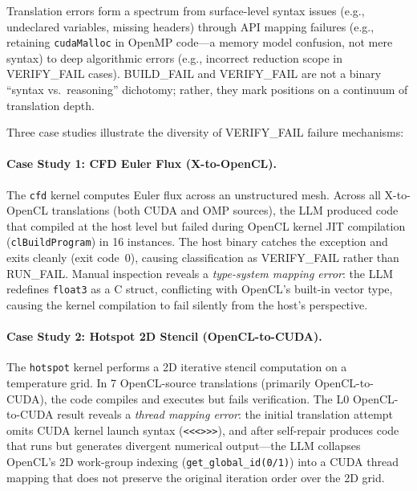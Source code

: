 \documentclass[conference]{IEEEtran}
\newcommand{\buildfail}{\textsc{BUILD\_FAIL}}
\newcommand{\runfail}{\textsc{RUN\_FAIL}}
\newcommand{\verifyfail}{\textsc{VERIFY\_FAIL}}
\begin{document}
Translation errors form a spectrum from surface-level syntax issues
(e.g., undeclared variables, missing headers) through API mapping
failures (e.g., retaining \texttt{cudaMalloc} in OpenMP code---a
memory model confusion, not mere syntax) to deep algorithmic
errors (e.g., incorrect reduction scope in \verifyfail{} cases).
\buildfail{} and \verifyfail{}{} are not a binary ``syntax vs.\ reasoning''
dichotomy; rather, they mark positions on a continuum of translation
depth.

Three case studies illustrate the diversity of \verifyfail{} failure mechanisms:

\paragraph{Case Study 1: CFD Euler Flux (X-to-OpenCL).}
The \texttt{cfd} kernel computes Euler flux across an unstructured mesh.
Across all X-to-OpenCL translations (both CUDA and OMP sources),
the LLM produced code that compiled at the host level but failed
during OpenCL kernel JIT compilation (\texttt{clBuildProgram}) in 16
instances. The host binary catches the exception and exits cleanly
(exit code~0), causing classification as \verifyfail{}{} rather than
\runfail{}. Manual inspection reveals a \emph{type-system mapping error}:
the LLM redefines \texttt{float3} as a C struct, conflicting with
OpenCL's built-in vector type, causing the kernel compilation to fail
silently from the host's perspective.

\paragraph{Case Study 2: Hotspot 2D Stencil (OpenCL-to-CUDA).}
The \texttt{hotspot} kernel performs a 2D iterative stencil computation
on a temperature grid. In 7 OpenCL-source translations (primarily
OpenCL-to-CUDA), the code compiles and executes but fails
verification. The L0 OpenCL-to-CUDA result reveals a \emph{thread
mapping error}: the initial translation attempt omits CUDA kernel
launch syntax (\texttt{<<<>>>}), and after self-repair produces code
that runs but generates divergent numerical output---the LLM
collapses OpenCL's 2D work-group indexing
(\texttt{get\_global\_id(0/1)}) into a CUDA thread mapping that
does not preserve the original iteration order over the 2D grid.
\end{document}

